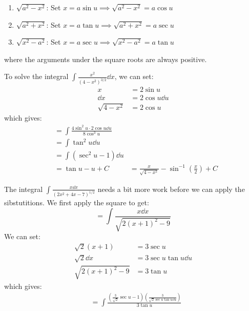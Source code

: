 \begin{itemize}
    \begin{enumerate}
        \item $\sqrt{a^2-x^2}$: Set $x=a\sin u \implies \sqrt{a^2-x^2} = a\cos u$
        \item $\sqrt{a^2+x^2}$: Set $x=a\tan u \implies \sqrt{a^2+x^2}=a\sec u$
        \item $\sqrt{x^2-a^2}$: Set $x=a\sec u \implies \sqrt{x^2-a^2} = a\tan u$
    \end{enumerate}
    where the arguments under the square roots are always positive.
    \begin{example}
        To solve the integral $\int \frac{x^2}{(4-x^2)^{3/2}} \dd{x}$, we can set:
        \begin{align}
            x &= 2\sin u \\ 
            \dd{x} &= 2\cos u \dd{u} \\ 
            \sqrt{4-x^2} &= 2\cos u
        \end{align}
        which gives:
        \begin{align}
            &= \int \frac{4\sin^2 u \cdot 2\cos u \dd{u}}{8\cos^3 u} \\ 
            &= \int \tan^2 u \dd{u} \\ 
            &= \int (\sec^2 u -1) \dd{u} \\ 
            &= \tan u - u + C
            &= \frac{x}{\sqrt{4-x^2}} - \sin^{-1}\left(\frac{x}{2}\right)+C
        \end{align}
    \end{example}
    \begin{example}
        The integral $\int \frac{x \dd{x}}{(2x^2+4x-7)^{1/2}}$ needs a bit more work before we can apply the sibstutitions. We first apply the square to get:
        \begin{equation}
            = \int \frac{x \dd{x}}{\sqrt{2(x+1)^2 - 9}}
        \end{equation}
        We can set:
        \begin{align}
            \sqrt{2} (x+1) &= 3\sec u \\ 
            \sqrt{2} \dd{x} &= 3\sec u \tan u \dd{u} \\ 
            \sqrt{2(x+1)^2-9} &= 3\tan u
        \end{align}
        which gives:
        \begin{align}
            &= \int \frac{\left(\frac{3}{\sqrt{2}}\sec u - 1\right)\left(\frac{3}{\sqrt{2}\sec u \tan u \dd{u}}\right)}{3\tan u} \\ 

\end{align}
\end{example}
\end{itemize}
